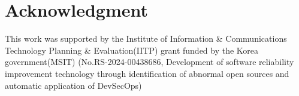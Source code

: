 \documentclass[10pt,conference]{IEEEtran}
\begin{document}
\section*{Acknowledgment}
    This work was supported by the Institute of Information \& Communications Technology Planning \& Evaluation(IITP) grant funded by the Korea government(MSIT) (No.RS-2024-00438686, Development of software reliability improvement technology through identification of abnormal open sources and automatic application of DevSecOps)




\end{document}
